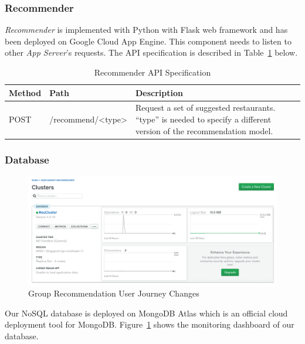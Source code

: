 \documentclass[12pt,oneside,openright,a4paper]{cpe-english-project}
\begin{document}
\subsubsection{Recommender}

\textit{Recommender} is implemented with Python with Flask web framework and has been deployed on Google Cloud App Engine. This component needs to listen to other \textit{App Server}’s requests. The API specification is described in Table~\ref{tbl:4RecommenderAPISpecification} below.

\begin{table}[H]
\caption{Recommender API Specification}\label{tbl:4RecommenderAPISpecification}
\begin{tabularx}{\textwidth}{l|l|X} \hline\hline
Method & Path & Description \\ \hline\hline
POST & /recommend/<type> & Request a set of suggested restaurants. “type” is needed to specify a different version of the recommendation model. \\ \hline\hline
\end{tabularx}
\end{table}

\subsubsection{Database}

\begin{figure}[H]\centering
\includegraphics[width=400pt]{./images/4mongodashboard.png}
\caption{Group Recommendation User Journey Changes}\label{fig:4mongodashboard}
\end{figure}\vspace{-24pt}

Our NoSQL database is deployed on MongoDB Atlas which is an official cloud deployment tool for MongoDB. Figure~\ref{fig:4mongodashboard} shows the monitoring dashboard of our database.
\end{document}
